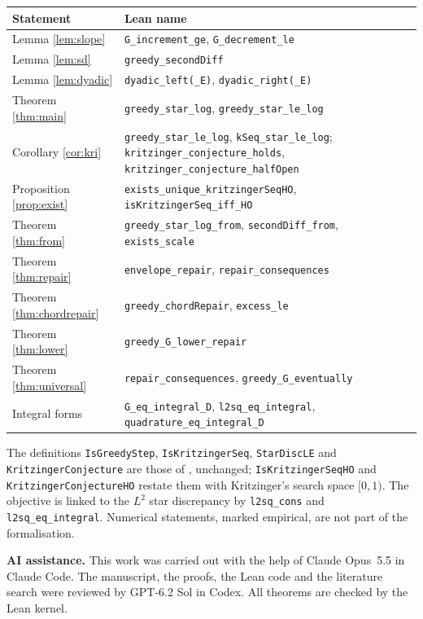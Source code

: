 \documentclass[11pt]{amsart}
\theoremstyle{remark}
\newcommand{\lean}[1]{\texttt{\small #1}}
\begin{document}
\begin{center}
\begin{tabular}{@{}ll@{}}
\toprule
Statement & Lean name \\
\midrule
Lemma \ref{lem:slope} & \lean{G\_increment\_ge}, \lean{G\_decrement\_le} \\
Lemma \ref{lem:sd} & \lean{greedy\_secondDiff} \\
Lemma \ref{lem:dyadic} & \lean{dyadic\_left(\_E)}, \lean{dyadic\_right(\_E)} \\
Theorem \ref{thm:main} & \lean{greedy\_star\_log}, \lean{greedy\_star\_le\_log} \\
Corollary \ref{cor:kri} & \lean{greedy\_star\_le\_log}, \lean{kSeq\_star\_le\_log}; \lean{kritzinger\_conjecture\_holds}, \lean{kritzinger\_conjecture\_halfOpen} \\
Proposition \ref{prop:exist} & \lean{exists\_unique\_kritzingerSeqHO}, \lean{isKritzingerSeq\_iff\_HO} \\
Theorem \ref{thm:from} & \lean{greedy\_star\_log\_from}, \lean{secondDiff\_from}, \lean{exists\_scale} \\
Theorem \ref{thm:repair} & \lean{envelope\_repair}, \lean{repair\_consequences} \\
Theorem \ref{thm:chordrepair} & \lean{greedy\_chordRepair}, \lean{excess\_le} \\
Theorem \ref{thm:lower} & \lean{greedy\_G\_lower\_repair} \\
Theorem \ref{thm:universal} & \lean{repair\_consequences}, \lean{greedy\_G\_eventually} \\
Integral forms & \lean{G\_eq\_integral\_D}, \lean{l2sq\_eq\_integral}, \lean{quadrature\_eq\_integral\_D} \\
\bottomrule
\end{tabular}
\end{center}

The definitions \lean{IsGreedyStep}, \lean{IsKritzingerSeq}, \lean{StarDiscLE}
and \lean{KritzingerConjecture} are those of \cite{Den}, unchanged;
\lean{IsKritzingerSeqHO} and \lean{KritzingerConjectureHO} restate them with
Kritzinger's search space $[0,1)$. The objective is linked to the $L^2$ star
discrepancy by \lean{l2sq\_cons} and \lean{l2sq\_eq\_integral}. Numerical
statements, marked empirical, are not part of the formalisation.

\medskip
\noindent\textbf{AI assistance.} This work was carried out with the help of
Claude Opus~5.5 in Claude Code. The manuscript, the proofs, the Lean code and the
literature search were reviewed by GPT-6.2 Sol in Codex. All theorems are checked
by the Lean kernel.
\end{document}
